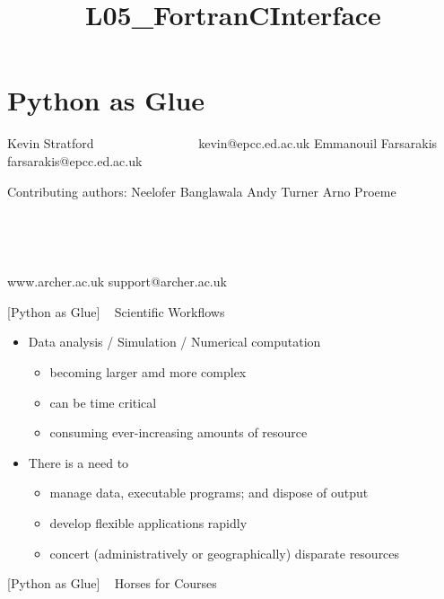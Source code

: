 \documentclass{article}
\title{L05\_FortranCInterface}
\begin{document}
    
    
    \maketitle
    
    

    
    \section{Python as Glue }\label{python-as-glue}

Kevin Stratford ~ ~ ~ ~ ~ ~ ~ ~ ~ ~kevin@epcc.ed.ac.uk Emmanouil
Farsarakis ~ ~ farsarakis@epcc.ed.ac.uk

Contributing authors: Neelofer Banglawala Andy Turner Arno Proeme 

    ~

    ~

www.archer.ac.uk support@archer.ac.uk

 

    {[}Python as Glue{]} ~ Scientific Workflows ~

\begin{itemize}
\itemsep1pt\parskip0pt
\item
  Data analysis / Simulation / Numerical computation

  \begin{itemize}
  \itemsep1pt\parskip0pt
  \item
    becoming larger amd more complex
  \item
    can be time critical
  \item
    consuming ever-increasing amounts of resource
  \end{itemize}
\item
  There is a need to

  \begin{itemize}
  \itemsep1pt\parskip0pt
  \item
    manage data, executable programs; and dispose of output
  \item
    develop flexible applications rapidly
  \item
    concert (administratively or geographically) disparate resources
  \end{itemize}
\end{itemize}

    {[}Python as Glue{]} ~ Horses for Courses ~
\end{document}
